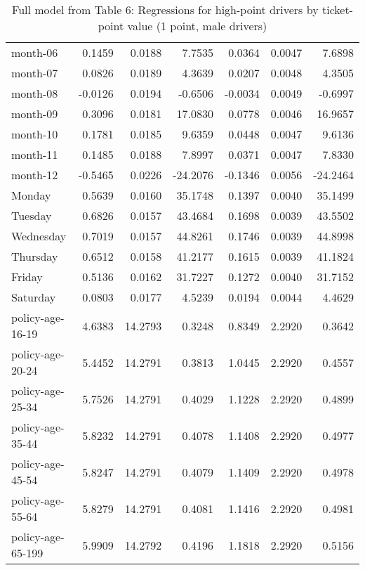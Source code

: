 \documentclass[10pt]{article}
\begin{document}
\begin{table}[ht]
\begin{tabular}{lrrrrrr}
  month-06 & 0.1459 & 0.0188 & 7.7535 & 0.0364 & 0.0047 & 7.6898 \\ 
  month-07 & 0.0826 & 0.0189 & 4.3639 & 0.0207 & 0.0048 & 4.3505 \\ 
  month-08 & -0.0126 & 0.0194 & -0.6506 & -0.0034 & 0.0049 & -0.6997 \\ 
  month-09 & 0.3096 & 0.0181 & 17.0830 & 0.0778 & 0.0046 & 16.9657 \\ 
  month-10 & 0.1781 & 0.0185 & 9.6359 & 0.0448 & 0.0047 & 9.6136 \\ 
  month-11 & 0.1485 & 0.0188 & 7.8997 & 0.0371 & 0.0047 & 7.8330 \\ 
  month-12 & -0.5465 & 0.0226 & -24.2076 & -0.1346 & 0.0056 & -24.2464 \\ 
  Monday & 0.5639 & 0.0160 & 35.1748 & 0.1397 & 0.0040 & 35.1499 \\ 
  Tuesday & 0.6826 & 0.0157 & 43.4684 & 0.1698 & 0.0039 & 43.5502 \\ 
  Wednesday & 0.7019 & 0.0157 & 44.8261 & 0.1746 & 0.0039 & 44.8998 \\ 
  Thursday & 0.6512 & 0.0158 & 41.2177 & 0.1615 & 0.0039 & 41.1824 \\ 
  Friday & 0.5136 & 0.0162 & 31.7227 & 0.1272 & 0.0040 & 31.7152 \\ 
  Saturday & 0.0803 & 0.0177 & 4.5239 & 0.0194 & 0.0044 & 4.4629 \\ 
  policy-age-16-19 & 4.6383 & 14.2793 & 0.3248 & 0.8349 & 2.2920 & 0.3642 \\ 
  policy-age-20-24 & 5.4452 & 14.2791 & 0.3813 & 1.0445 & 2.2920 & 0.4557 \\ 
  policy-age-25-34 & 5.7526 & 14.2791 & 0.4029 & 1.1228 & 2.2920 & 0.4899 \\ 
  policy-age-35-44 & 5.8232 & 14.2791 & 0.4078 & 1.1408 & 2.2920 & 0.4977 \\ 
  policy-age-45-54 & 5.8247 & 14.2791 & 0.4079 & 1.1409 & 2.2920 & 0.4978 \\ 
  policy-age-55-64 & 5.8279 & 14.2791 & 0.4081 & 1.1416 & 2.2920 & 0.4981 \\ 
  policy-age-65-199 & 5.9909 & 14.2792 & 0.4196 & 1.1818 & 2.2920 & 0.5156 \\ 
   \hline
\end{tabular}
\caption{Full model from Table 6: Regressions for high-point drivers by ticket-point value (1 point, male drivers)} 
\label{tab_6_1_pts_M}
\end{table}


\clearpage
\pagebreak
\end{document}
